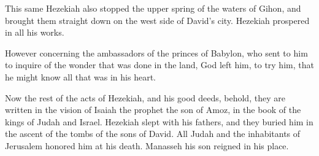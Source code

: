 {This same Hezekiah also stopped the upper spring of the waters of Gihon, and brought them straight down on the west side of David’s city. Hezekiah prospered in all his works.
\par }{\PP {}However concerning the ambassadors of the princes of Babylon, who sent to him to inquire of the wonder that was done in the land, God left him, to try him, that he might know all that was in his heart.
\par }{\PP {}Now the rest of the acts of Hezekiah, and his good deeds, behold, they are written in the vision of Isaiah the prophet the son of Amoz, in the book of the kings of Judah and Israel.
Hezekiah slept with his fathers, and they buried him in the ascent of the tombs of the sons of David. All Judah and the inhabitants of Jerusalem honored him at his death. Manasseh his son reigned in his place.

}
